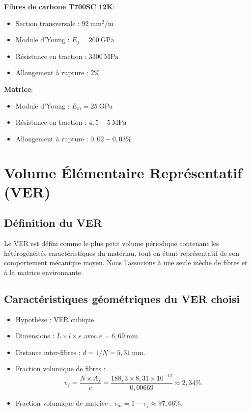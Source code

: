 \documentclass{rapportECL}
\begin{document}
\begin{minipage}{0.48\textwidth}
\begin{framed}
\textbf{Fibres de carbone T700SC 12K}:
\begin{itemize}
\item Section transversale : $92\ \si{\milli\meter^2\per\meter}$
\item Module d'Young : $E_f = 200\ \si{\giga\pascal}$
\item Résistance en traction : $3300\ \si{\mega\pascal}$
\item Allongement à rupture : $2\%$
\end{itemize}
\end{framed}
\end{minipage}
\hfill
\begin{minipage}{0.48\textwidth}
\begin{framed}
\textbf{Matrice}:
\begin{itemize}
\item Module d'Young : $E_m = 25\ \si{\giga\pascal}$
\item Résistance en traction : $4,5-5\ \si{\mega\pascal}$
\item Allongement à rupture : $0,02-0,03\%$
\end{itemize}
\end{framed}
\end{minipage}

\newpage

\section{Volume Élémentaire Représentatif (VER)}
\vspace{20pt}

\subsection{Définition du VER}
Le VER est défini comme le plus petit volume périodique contenant les hétérogénéités caractéristiques du matériau, tout en étant représentatif de son comportement mécanique moyen. Nous l'associons à une seule mèche de fibres et à la matrice environnante.

\subsection*{Caractéristiques géométriques du VER choisi}
\begin{itemize}
\item Hypothèse : VER cubique.
\item Dimensions : $L\times l \times e$ avec $e = 6,69\ \si{\milli\meter}$.
\item Distance inter-fibres : $d = 1/N = 5,31\ \si{\milli\meter}$.
\item Fraction volumique de fibres : 
\[
v_f = \frac{N \times A_f}{e} = \frac{188,3 \times 8,31\times10^{-12}}{0,00669} \approx 2,34\%.
\]
\item Fraction volumique de matrice : $v_m = 1 - v_f \approx 97,66\%$.
\end{itemize}
\end{document}
